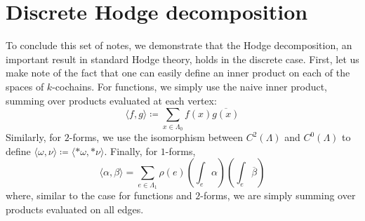 \documentclass[aps,pra,showpacs,notitlepage,onecolumn,superscriptaddress,nofootinbib]{revtex4-1}
\theoremstyle{definition}
\begin{document}
\section{Discrete Hodge decomposition}

\noindent To conclude this set of notes, we demonstrate that the Hodge decomposition, an important result in standard Hodge theory, holds
in the discrete case. First, let us make note of the fact that one can easily define an inner product on each of the spaces of $k$-cochains.
For functions, we simply use the naive inner product, summing over products evaluated at each vertex:
\begin{equation}
  \langle f, g \rangle \coloneqq \displaystyle\sum_{x \in \Lambda_{0}} f(x) \overline{g(x)}
\end{equation}
Similarly, for $2$-forms, we use the isomorphism between $C^2(\Lambda)$ and $C^0(\Lambda)$ to define $\langle \omega, \nu \rangle \coloneqq \langle * \omega, * \nu \rangle$.
Finally, for $1$-forms,
\begin{equation}
  \langle \alpha, \beta \rangle = \displaystyle\sum_{e \in \Lambda_1} \rho(e) \left( \displaystyle\int_{e} \alpha \right) \left( \displaystyle\int_{e} \overline{\beta} \right) 
\end{equation}
where, similar to the case for functions and $2$-forms, we are simply summing over products evaluated on all edges.
\end{document}
